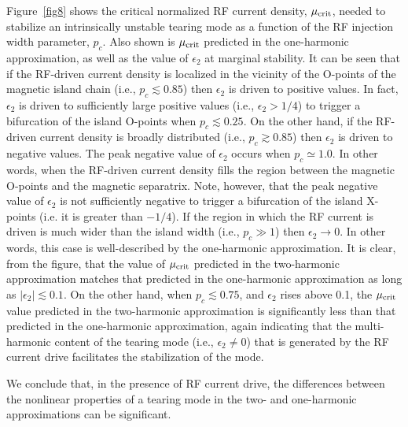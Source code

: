 \documentclass[12pt,prb,aps]{revtex4-1}
\begin{document}
Figure~\ref{fig8} shows the critical normalized RF current density, $\mu_{\rm crit}$, needed to stabilize an intrinsically
unstable tearing mode as a function of the RF injection width parameter, $p_c$. Also shown is  $\mu_{\rm crit}$ predicted in the one-harmonic approximation, as well as the value of $\epsilon_2$ at marginal stability. It can be seen that
if the RF-driven current density is localized in the vicinity of the O-points of the magnetic island chain (i.e., $p_c\lesssim 0.85$) then $\epsilon_2$ is driven to positive values. In fact, $\epsilon_2$ is driven to sufficiently large positive
values (i.e., $\epsilon_2>1/4$) to trigger a bifurcation of the  island O-points when  $p_c\lesssim 0.25$. On the other hand, if the RF-driven current density is broadly distributed (i.e., $p_c\gtrsim 0.85$) then $\epsilon_2$ is driven to negative values. The peak negative value of $\epsilon_2$ occurs when $p_c\simeq 1.0$. In other words,
when the RF-driven current density fills the region between the magnetic O-points and the magnetic separatrix. Note, however, that the peak negative value of $\epsilon_2$ is not sufficiently negative to trigger a  bifurcation of the
island X-points (i.e. it is greater than $-1/4$). If the region in which the RF current is driven is much wider than the
island width (i.e., $p_c\gg 1$) then $\epsilon_2\rightarrow 0$. In other words, this case is well-described by the one-harmonic approximation. It is clear, from the figure, that the value of $\mu_{\rm crit}$ predicted  in the two-harmonic approximation matches that predicted in the one-harmonic approximation as long as $|\epsilon_2|\lesssim 0.1$. On the other hand, when $p_c\lesssim 0.75$, and $\epsilon_2$ rises above 0.1, the $\mu_{\rm crit}$ value predicted  in the 
two-harmonic approximation is significantly less than that predicted  in the one-harmonic approximation, again indicating that the multi-harmonic content of the tearing mode (i.e., $\epsilon_2\neq 0$) that is
generated by the RF current drive facilitates the stabilization of the mode. 

We conclude that, in the presence of RF current drive, the differences between the nonlinear properties
of a tearing mode in the two- and one-harmonic approximations can be significant.  
 
\end{document}
